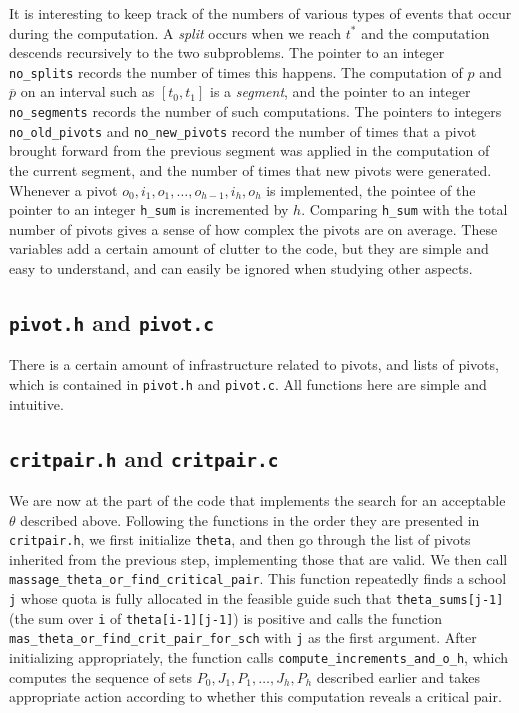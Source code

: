 \documentclass[12pt]{article}
\theoremstyle{definition}
\newcommand{\barp}{\overline{p}}
\begin{document}
\begin{appendix}
It is interesting to keep track of the numbers of various types of
events that occur during the computation.  A \emph{split} occurs when
we reach $t^*$ and the computation descends recursively to the two
subproblems.  The pointer to an integer \texttt{no\_splits} records
the number of times this happens.  The computation of $p$ and $\barp$
on an interval such as $[t_0,t_1]$ is a \emph{segment}, and the
pointer to an integer \texttt{no\_segments} records the number of such
computations.  The pointers to integers \texttt{no\_old\_pivots} and
\texttt{no\_new\_pivots} record the number of times that a pivot
brought forward from the previous segment was applied in the
computation of the current segment, and the number of times that new
pivots were generated.  Whenever a pivot $o_0,i_1,o_1, \ldots,
o_{h-1},i_h, o_h$ is implemented, the pointee of the pointer to an
integer \texttt{h\_sum} is incremented by $h$.  Comparing
\texttt{h\_sum} with the total number of pivots gives a sense of how
complex the pivots are on average.  These variables add a certain
amount of clutter to the code, but they are simple and easy to
understand, and can easily be ignored when studying other aspects.

\subsection{\texttt{pivot.h} and \texttt{pivot.c}}

There is a certain amount of infrastructure related to pivots, and
lists of pivots, which is contained in \texttt{pivot.h} and
\texttt{pivot.c}.  All functions here are simple and intuitive.

\subsection{\texttt{critpair.h} and \texttt{critpair.c}}

We are now at the part of the code that implements the search for an
acceptable $\theta$ described above.  Following the functions in the
order they are presented in \texttt{critpair.h}, we first initialize
\texttt{theta}, and then go through the list of pivots inherited from
the previous step, implementing those that are valid.  We then call
\texttt{massage\_theta\_or\_find\_critical\_pair}.  This function
repeatedly finds a school \texttt{j} whose quota is fully allocated in
the feasible guide such that \texttt{theta\_sums[j-1]} (the sum over
\texttt{i} of \texttt{theta[i-1][j-1]}) is positive and calls the
function \texttt{mas\_theta\_or\_find\_crit\_pair\_for\_sch} with
\texttt{j} as the first argument.  After initializing appropriately,
the function calls \texttt{compute\_increments\_and\_o\_h}, which
computes the sequence of sets $P_0, J_1, P_1, \ldots, J_h, P_h$
described earlier and takes appropriate action according to whether
this computation reveals a critical pair.

\end{appendix}



\end{document}

